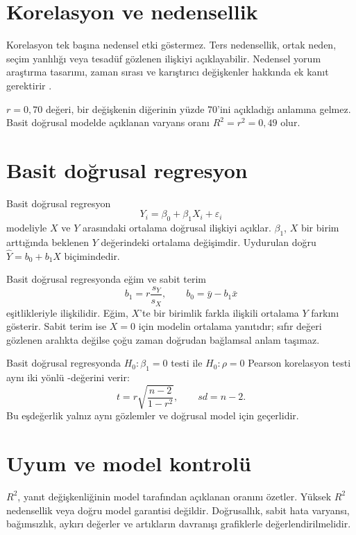 \section{Korelasyon ve nedensellik}
\label{sec:correlation-causality}

Korelasyon tek başına nedensel etki göstermez. Ters nedensellik, ortak neden,
seçim yanlılığı veya tesadüf gözlenen ilişkiyi açıklayabilir. Nedensel yorum
araştırma tasarımı, zaman sırası ve karıştırıcı değişkenler hakkında ek kanıt
gerektirir \citep{shadish2002,gelman2020}.

\begin{mistakebox}
$r=0{,}70$ değeri, bir değişkenin diğerinin yüzde 70'ini açıkladığı anlamına
gelmez. Basit doğrusal modelde açıklanan varyans oranı $R^2=r^2=0{,}49$ olur.
\end{mistakebox}

\section{Basit doğrusal regresyon}
\label{sec:simple-regression}

Basit doğrusal regresyon
\[
Y_i=\beta_0+\beta_1X_i+\varepsilon_i
\]
modeliyle $X$ ve $Y$ arasındaki ortalama doğrusal ilişkiyi açıklar. $\beta_1$,
$X$ bir birim arttığında beklenen $Y$ değerindeki ortalama değişimdir.
Uydurulan doğru $\hat Y=b_0+b_1X$ biçimindedir.

Basit doğrusal regresyonda eğim ve sabit terim
\[
b_1=r\frac{s_Y}{s_X},
\qquad
b_0=\bar y-b_1\bar x
\]
eşitlikleriyle ilişkilidir. Eğim, $X$'te bir birimlik farkla ilişkili ortalama
$Y$ farkını gösterir. Sabit terim ise $X=0$ için modelin ortalama yanıtıdır;
sıfır değeri gözlenen aralıkta değilse çoğu zaman doğrudan bağlamsal anlam
taşımaz.

Basit doğrusal regresyonda $H_0:\beta_1=0$ testi ile
$H_0:\rho=0$ Pearson korelasyon testi aynı iki yönlü \pval-değerini verir:
\[
t=r\sqrt{\frac{n-2}{1-r^2}},\qquad sd=n-2.
\]
Bu eşdeğerlik yalnız aynı gözlemler ve doğrusal model için geçerlidir.

\section{Uyum ve model kontrolü}
\label{sec:regression-diagnostics}

$R^2$, yanıt değişkenliğinin model tarafından açıklanan oranını özetler.
Yüksek $R^2$ nedensellik veya doğru model garantisi değildir. Doğrusallık,
sabit hata varyansı, bağımsızlık, aykırı değerler ve artıkların davranışı
grafiklerle değerlendirilmelidir.

